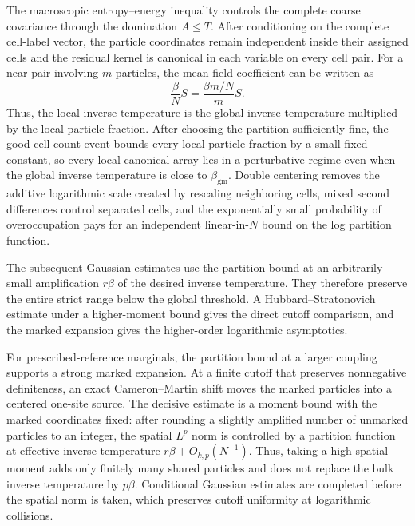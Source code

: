 \documentclass[11pt,reqno]{amsart}
\numberwithin{equation}{section}
\theoremstyle{plain}
\theoremstyle{definition}
\newcommand{\be}{\beta}
\newcommand{\gm}{\mathrm{gm}}
\begin{document}
The macroscopic entropy--energy inequality controls the complete coarse covariance through the domination $A\leq T$.  After conditioning on the complete cell-label vector, the particle coordinates remain independent inside their assigned cells and the residual kernel is canonical in each variable on every cell pair.  For a near pair involving $m$ particles, the mean-field coefficient can be written as
\begin{equation}
 \frac{\be}{N}S
 =\frac{\be m/N}{m}S.
 \label{eq:intro-local-temperature}
\end{equation}
Thus, the local inverse temperature is the global inverse temperature multiplied by the local particle fraction.  After choosing the partition sufficiently fine, the good cell-count event bounds every local particle fraction by a small fixed constant, so every local canonical array lies in a perturbative regime even when the global inverse temperature is close to $\beta_{\gm}$.  Double centering removes the additive logarithmic scale created by rescaling neighboring cells, mixed second differences control separated cells, and the exponentially small probability of overoccupation pays for an independent linear-in-$N$ bound on the log partition function.

The subsequent Gaussian estimates use the partition bound at an arbitrarily small amplification $r\be$ of the desired inverse temperature. They therefore preserve the entire strict range below the global threshold. A Hubbard--Stratonovich estimate under a higher-moment bound gives the direct cutoff comparison, and the marked expansion gives the higher-order logarithmic asymptotics.



For prescribed-reference marginals, the partition bound at a larger coupling supports a strong marked expansion.  At a finite cutoff that preserves nonnegative definiteness, an exact Cameron--Martin shift moves the marked particles into a centered one-site source.  The decisive estimate is a moment bound with the marked coordinates fixed: after rounding a slightly amplified number of unmarked particles to an integer, the spatial $L^p$ norm is controlled by a partition function at effective inverse temperature $r\be+O_{k,p}(N^{-1})$.  Thus, taking a high spatial moment adds only finitely many shared particles and does not replace the bulk inverse temperature by $p\be$.  Conditional Gaussian estimates are completed before the spatial norm is taken, which preserves cutoff uniformity at logarithmic collisions.
\end{document}
